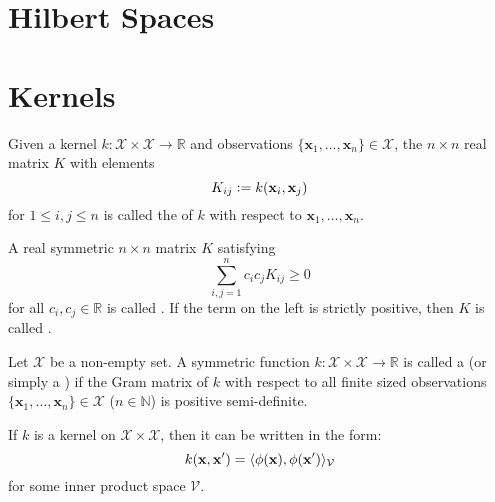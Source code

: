 \section{Hilbert Spaces}


\section{Kernels}

\begin{definition}
Given a kernel $k : \mathcal{X} \times \mathcal{X} \to \mathbb{R}$ and observations $\{ \mathbf{x}_1, \dotsc, \mathbf{x}_n \} \in \mathcal{X}$, the $n \times n$ real matrix $K$ with elements
\begin{equation}
	K_{ij} \vcentcolon= k(\mathbf{x}_i, \mathbf{x}_j)
\end{equation}
for $1 \leq i, j \leq n$ is called the  of $k$ with respect to $\mathbf{x}_1, \dotsc, \mathbf{x}_n$.
\end{definition}

\begin{definition}
A real symmetric $n \times n$ matrix $K$ satisfying
\begin{equation}
	\sum_{i, j=1}^n c_i c_j K_{ij} \geq 0
\end{equation}
for all $c_i, c_j \in \mathbb{R}$ is called . If the term on the left is strictly positive, then $K$ is called .
\end{definition}

\begin{definition}
Let $\mathcal{X}$ be a non-empty set. A symmetric function $k : \mathcal{X} \times \mathcal{X} \to \mathbb{R}$ is called a  (or simply a ) if the Gram matrix of $k$ with respect to all finite sized observations $\{ \mathbf{x}_1, \dotsc, \mathbf{x}_n \} \in \mathcal{X}$ ($n \in \mathbb{N}$) is positive semi-definite.
\end{definition}

\begin{theorem}
If $k$ is a kernel on $\mathcal{X} \times \mathcal{X}$, then it can be written in the form:
\begin{equation}
  k(\mathbf{x}, \mathbf{x}^\prime) = \langle\phi(\mathbf{x}), \phi(\mathbf{x}^\prime)\rangle_\mathcal{V}
\end{equation}
for some inner product space $\mathcal{V}$.
\end{theorem}

